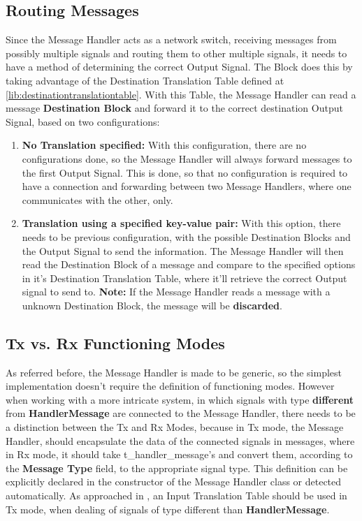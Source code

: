 \begin{refsection}
\subsection{Routing Messages}
Since the Message Handler acts as a network switch, receiving messages from 
possibly multiple signals and routing them to other multiple signals, it needs
to have a method of determining the correct Output Signal. The Block does this 
by taking advantage of the Destination Translation Table defined at 
\autoref{lib:destinationtranslationtable}. With this Table, the Message Handler can 
read a message \textbf{Destination Block} and forward it to the correct 
destination Output Signal, based on two configurations:
\begin{enumerate}
	\item \textbf{No Translation specified:} With this configuration, there are
		no configurations done, so the Message Handler will always forward 
		messages to the first Output Signal. This is done, so that no 
		configuration is required to have a connection and forwarding between 
		two Message Handlers, where one communicates with the other, only.
	\item \textbf{Translation using a specified key-value pair:} With this 
		option, there needs to be previous configuration, with the possible
		Destination Blocks and the Output Signal to send the information. The 
		Message Handler will then read the Destination Block of a message and 
		compare to the specified options in it's Destination Translation Table, 
		where it'll retrieve the correct Output signal to send to. 
		\textbf{Note:} If the Message Handler reads a message with a unknown
		Destination Block, the message will be \textbf{discarded}.
\end{enumerate}

\subsection{Tx vs. Rx Functioning Modes}
As referred before, the Message Handler is made to be generic, so the simplest 
implementation doesn't require the definition of functioning modes. However when
working with a more intricate system, in which signals with type \textbf{different} 
from \textbf{HandlerMessage} are connected to the Message Handler, there needs to be 
a distinction between the Tx and Rx Modes, because in Tx mode, the Message Handler,
should encapsulate the data of the connected signals in messages, where in Rx mode,
it should take t\_handler\_message's and convert them, according to the \textbf{Message 
Type} field, to the appropriate signal type. This definition can be explicitly declared
in the constructor of the Message Handler class or detected automatically. As approached
in , an Input Translation Table should be used in 
Tx mode, when dealing of signals of type different than \textbf{HandlerMessage}.


\end{refsection}
